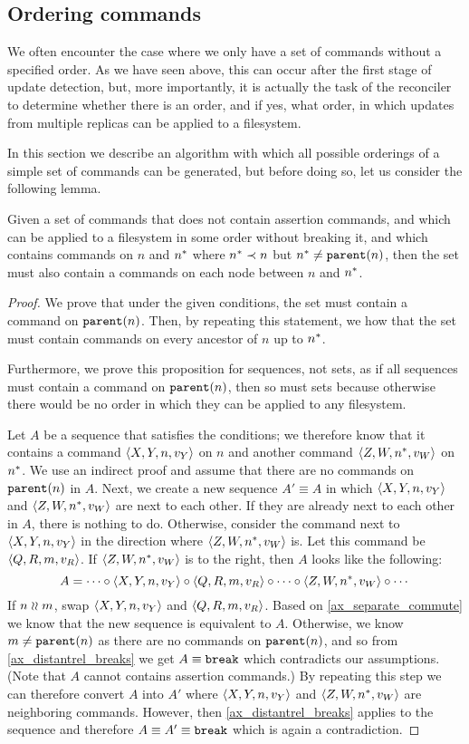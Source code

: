 
\subsection{Ordering commands}\label{ordering}

We often encounter the case where we only have a set of commands without a specified order.
As we have seen above, this can occur after the first stage of update detection,
but, more importantly,
it is actually the task of the reconciler to determine whether there is an order,
and if yes, what order,
in which updates from multiple replicas can be applied to a filesystem.

In this section we describe an algorithm with which all possible orderings of a
simple set of commands can be generated, but before doing so, let us consider the following lemma.

\begin{mylem}\label{connected_changes}
Given a set of commands that
does not contain assertion commands,
and which can be applied to a filesystem in some order without breaking it,
and which contains commands on $n$ and $n^*$ where $n^*\prec n$
but $n^*\neq\mathtt{parent}(n)$, then the set must also contain a commands
on each node between $n$ and $n^*$.
\end{mylem}
\begin{proof}
We prove that under the given conditions, the set must contain a command on $\mathtt{parent}(n)$.
Then, by repeating this statement, we how that the set must contain commands on every
ancestor of $n$ up to $n^*$.

Furthermore,
we prove this proposition for sequences, not sets, as if all sequences must contain a command on $\mathtt{parent}(n)$,
then so must sets because otherwise there would be no order in which they can be
applied to any filesystem.

Let $A$ be a sequence that satisfies the conditions;
we therefore know that it contains a command $\langle{X,Y,n,v_Y}\rangle$ on $n$
and another command $\langle{Z,W,n^*,v_W}\rangle$ on $n^*$.
We use an indirect proof and assume that there are no commands on $\mathtt{parent}(n)$ in $A$.
Next, we create a new sequence $A'\equiv A$ in which $\langle{X,Y,n,v_Y}\rangle$ and $\langle{Z,W,n^*,v_W}\rangle$ are next to each other.
If they are already next to each other in $A$, there is nothing to do.
Otherwise, consider the command next to $\langle{X,Y,n,v_Y}\rangle$ in the direction where $\langle{Z,W,n^*,v_W}\rangle$ is.
Let this command be $\langle{Q,R,m,v_R}\rangle$.
If $\langle{Z,W,n^*,v_W}\rangle$ is to the right, then $A$ looks like the following:
\[ A = \cdots\circ\langle{X,Y,n,v_Y}\rangle\circ\langle{Q,R,m,v_R}\rangle\circ\cdots\circ\langle{Z,W,n^*,v_W}\rangle\circ\cdots \]
If $n\mathrel{\wr\wr} m$, swap $\langle{X,Y,n,v_Y}\rangle$ and $\langle{Q,R,m,v_R}\rangle$. Based on \cref{ax_separate_commute} we know that the new
sequence is equivalent to $A$.
Otherwise, we know $m\neq\mathtt{parent}(n)$ as there are no commands on $\mathtt{parent}(n)$, and so
from \cref{ax_distantrel_breaks} we get $A\equiv\mathtt{break}$ which contradicts our assumptions.
(Note that $A$ cannot contains assertion commands.)
By repeating this step we can therefore convert $A$ into $A'$ where $\langle{X,Y,n,v_Y}\rangle$ and $\langle{Z,W,n^*,v_W}\rangle$ are neighboring commands.
However, then \cref{ax_distantrel_breaks} applies to the sequence and therefore $A\equiv A'\equiv\mathtt{break}$ which
is again a contradiction.
\end{proof}

